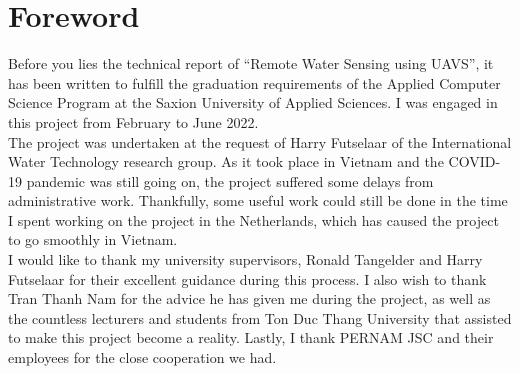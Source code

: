 \newpage
\section*{Foreword}
Before you lies the technical report of “Remote Water Sensing using UAVS”, it has been written to fulfill the graduation requirements of the Applied Computer Science Program at the Saxion University of Applied Sciences. I was engaged in this project from February to June 2022.\\

The project was undertaken at the request of Harry Futselaar of the International Water Technology research group. As it took place in Vietnam and the COVID-19 pandemic was still going on, the project suffered some delays from administrative work. Thankfully, some useful work could still be done in the time I spent working on the project in the Netherlands, which has caused the project to go smoothly in Vietnam.\\

I would like to thank my university supervisors, Ronald Tangelder and Harry Futselaar for their excellent guidance during this process. I also wish to thank Tran Thanh Nam for the advice he has given me during the project, as well as the countless lecturers and students from Ton Duc Thang University that assisted to make this project become a reality. Lastly, I thank PERNAM JSC and their employees for the close cooperation we had.